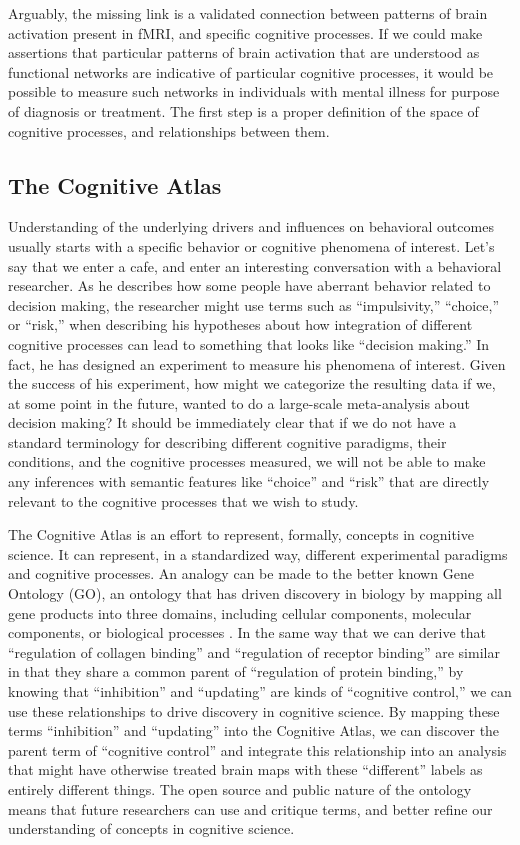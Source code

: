 \documentclass{report}
\begin{document}
Arguably, the missing link is a validated connection between patterns of brain activation present in fMRI, and specific cognitive processes. If we could make assertions that particular patterns of brain activation that are understood as functional networks are indicative of particular cognitive processes, it would be possible to measure such networks in individuals with mental illness for purpose of diagnosis or treatment. The first step is a proper definition of the space of cognitive processes, and relationships between them.

\subsection{The Cognitive Atlas}
Understanding of the underlying drivers and influences on behavioral
outcomes usually starts with a specific behavior or cognitive phenomena
of interest. Let's say that we enter a cafe, and enter an interesting
conversation with a behavioral researcher. As he describes how some
people have aberrant behavior related to decision making, the researcher
might use terms such as ``impulsivity,'' ``choice,'' or ``risk,'' when
describing his hypotheses about how integration of different cognitive
processes can lead to something that looks like ``decision making.'' In
fact, he has designed an experiment to measure his phenomena of
interest. Given the success of his experiment, how might we categorize
the resulting data if we, at some point in the future, wanted to do a
large-scale meta-analysis about decision making? It should be
immediately clear that if we do not have a standard terminology for
describing different cognitive paradigms, their conditions, and the
cognitive processes measured, we will not be able to make any inferences
with semantic features like ``choice'' and ``risk'' that are directly
relevant to the cognitive processes that we wish to study.

The Cognitive Atlas \cite{Poldrack2011-jp} is
an effort to represent, formally, concepts in cognitive science. It can
represent, in a standardized way, different experimental paradigms and
cognitive processes. An analogy can be made to the better known Gene
Ontology (GO), an ontology that has driven discovery in biology by
mapping all gene products into three domains, including cellular
components, molecular components, or biological processes \cite{Ashburner2000-am}.
In the same way that we can derive that ``regulation of collagen
binding'' and ``regulation of receptor binding'' are similar in that
they share a common parent of ``regulation of protein binding,'' by
knowing that ``inhibition'' and ``updating'' are kinds of ``cognitive
control,'' we can use these relationships to drive discovery in
cognitive science. By mapping these terms ``inhibition'' and
``updating'' into the Cognitive Atlas, we can discover the parent term
of ``cognitive control'' and integrate this relationship into an
analysis that might have otherwise treated brain maps with these
``different'' labels as entirely different things. The open source and
public nature of the ontology means that future researchers can use and
critique terms, and better refine our understanding of concepts in
cognitive science. 
\end{document}
